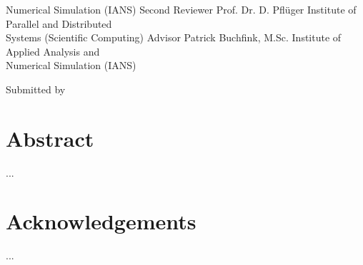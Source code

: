 \documentclass[twoside,a4paper]{article}
\begin{document}
\begin{titlePageST}
\begin{supervisorST}{3}
{Numerical Simulation (IANS)}%
\addSuper%
{Second Reviewer}%
{Prof. Dr. D. Pflüger}%
{Institute of Parallel and Distributed\\[-0.2cm]
Systems (Scientific Computing)}%
\addSuper%
{Advisor}%
{Patrick Buchfink, M.Sc.}%
{Institute of Applied Analysis and\\[-0.2cm]
Numerical Simulation (IANS)}%
\end{supervisorST}%
\vspace{80pt}%
\begin{authorST}{Submitted by}%
\end{authorST}%
\end{titlePageST}
\clearpage
\newpage\thispagestyle{plain}\null
\newpage\thispagestyle{plain}

%
%
\section*{Abstract}
...
\clearpage
\newpage\thispagestyle{plain}\null
\newpage\thispagestyle{plain}

%
%
\section*{Acknowledgements}
...
\clearpage
\newpage\thispagestyle{plain}\null
\newpage\thispagestyle{plain}

%
%
\setcounter{tocdepth}{2}
\tableofcontents
\clearpage
\newpage\thispagestyle{plain}\null
%
%
\newpage
{} 
%
%
\end{document}
